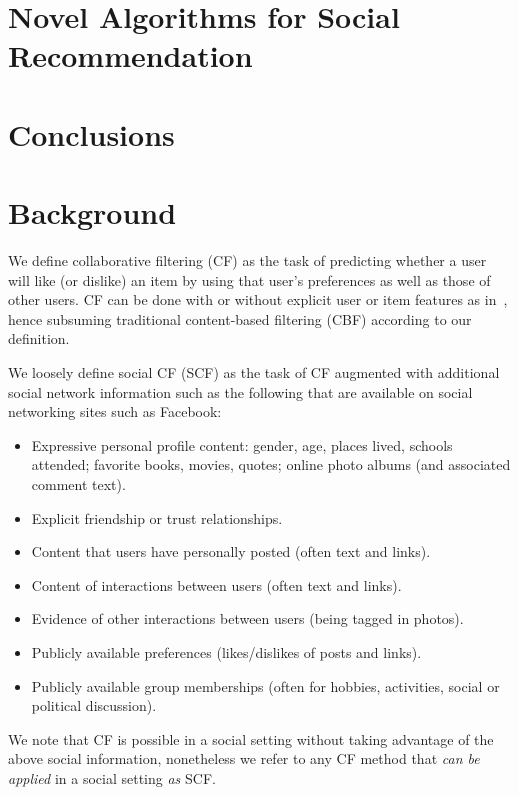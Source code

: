 \documentclass{sig-alternate}
\begin{document}
\label{sec:Baselines}

\section{Novel Algorithms for Social Recommendation}

\label{sec:NovelAlgs}

\section{Conclusions}

\label{sec:Conclusions}

\section{Background}

We define collaborative filtering (CF) as the task of predicting
whether a user will like (or dislike) an item by using that user's
preferences as well as those of other users.  CF can be done with or
without explicit user or item features as in~\cite{matchbox}, hence
subsuming traditional content-based filtering (CBF) according to our
definition.

We loosely define social CF (SCF) as the task of CF augmented with
additional social network information such as the following that
are available on social networking sites such as Facebook:
\begin{itemize}
\item Expressive personal profile content: gender, age, places lived, schools
attended; favorite books, movies, quotes; online photo albums (and associated comment text).
\item Explicit friendship or trust relationships.
\item Content that users have personally posted (often text and links).
\item Content of interactions between users (often text and links).
\item Evidence of other interactions between users (being tagged in photos).
\item Publicly available preferences (likes/dislikes of posts and links).
\item Publicly available group memberships (often for hobbies, activities, social or political discussion).
\end{itemize}
We note that CF is possible in a social setting without taking advantage
of the above social information, nonetheless we refer to any CF method
that \emph{can be applied} in a social setting \emph{as} SCF.
\end{document}
